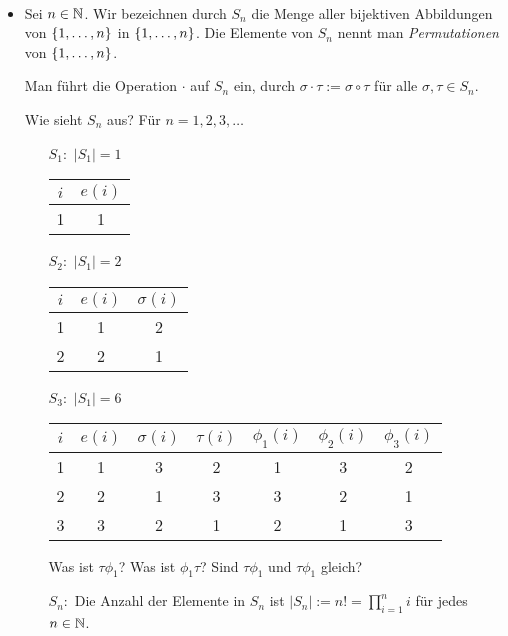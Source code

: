 \begin{bsp}\
\begin{itemize}
	\item Sei $ n \in \mathbb N $. Wir bezeichnen durch $ S_n $ die Menge aller bijektiven Abbildungen von $ \{ 1,\ldots,n \} $ in $ \{ 1,\ldots,n \} $. Die Elemente von $ S_n $ nennt man \emph{Permutationen} von $ \{ 1,\ldots,n \} $.
	
	Man führt die Operation $ \cdot $ auf $ S_n $ ein, durch $ \sigma \cdot \tau := \sigma \circ \tau $ für alle $ \sigma,\tau \in S_n $.
	
	Wie sieht $ S_n $ aus? Für $ n = 1,2,3,\ldots $
	\begin{itemize}
		\item[$ S_1 : $] $ |S_1| = 1 $

		\begin{center} 
		\begin{tabular}{c|c}
			$ i $ & $ e(i) $ \\
			\hline
			1 & 1
		\end{tabular}
		\end{center} 
	
		\item[$ S_2 : $] $ |S_1| = 2 $

		\begin{center} 
		\begin{tabular}{c|cc}
			$ i $ & $ e(i) $ & $ \sigma(i) $ \\
			\hline
			1 & 1 & 2 \\
			2 & 2 & 1
		\end{tabular}
		\end{center} 
	
		\item[$ S_3 : $] $ |S_1| = 6 $

		\begin{center} 
		\begin{tabular}{c|cccccc}
			$ i $ & $ e(i) $ & $ \sigma(i) $ & $ \tau(i) $ & $ \phi_1(i) $ & $ \phi_2(i) $ & $ \phi_3(i) $ \\
			\hline
			1 & 1 & 3 & 2 & 1 & 3 & 2 \\
			2 & 2 & 1 & 3 & 3 & 2 & 1 \\
			3 & 3 & 2 & 1 & 2 & 1 & 3 
		\end{tabular}
		\end{center} 

		Was ist $ \tau \phi_1 $? 	Was ist $ \phi_1 \tau $? Sind $\tau \phi_1$ und $\tau \phi_1$ gleich? 

		\item[$ S_n : $] Die Anzahl der Elemente in $ S_n $ ist $ |S_n| := n! = \prod\limits_{i=1}^{n}i $ für jedes $ n \in \mathbb N $.


\end{itemize}
\end{itemize}
\end{bsp}
